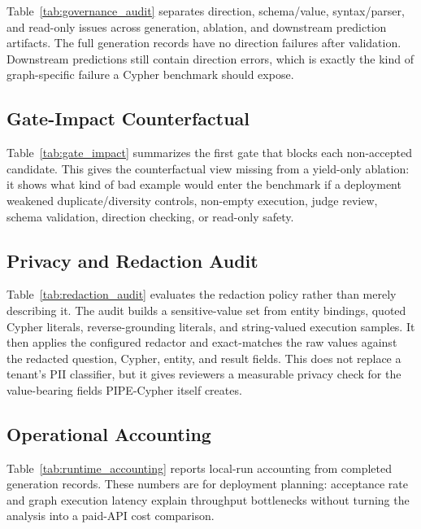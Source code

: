 \documentclass[11pt]{article}
\begin{document}


Table~\ref{tab:governance_audit} separates direction, schema/value, syntax/parser, and read-only issues across generation, ablation, and downstream prediction artifacts. The full generation records have no direction failures after validation. Downstream predictions still contain direction errors, which is exactly the kind of graph-specific failure a Cypher benchmark should expose.



\subsection{Gate-Impact Counterfactual}

Table~\ref{tab:gate_impact} summarizes the first gate that blocks each non-accepted candidate. This gives the counterfactual view missing from a yield-only ablation: it shows what kind of bad example would enter the benchmark if a deployment weakened duplicate/diversity controls, non-empty execution, judge review, schema validation, direction checking, or read-only safety.



\subsection{Privacy and Redaction Audit}

Table~\ref{tab:redaction_audit} evaluates the redaction policy rather than merely describing it. The audit builds a sensitive-value set from entity bindings, quoted Cypher literals, reverse-grounding literals, and string-valued execution samples. It then applies the configured redactor and exact-matches the raw values against the redacted question, Cypher, entity, and result fields. This does not replace a tenant's PII classifier, but it gives reviewers a measurable privacy check for the value-bearing fields PIPE-Cypher itself creates.



\subsection{Operational Accounting}

Table~\ref{tab:runtime_accounting} reports local-run accounting from completed generation records. These numbers are for deployment planning: acceptance rate and graph execution latency explain throughput bottlenecks without turning the analysis into a paid-API cost comparison.
\end{document}
